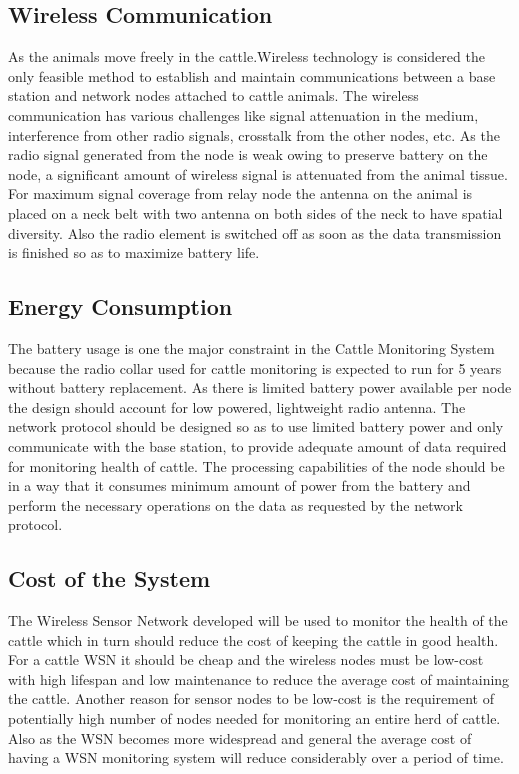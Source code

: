 \documentclass[conference]{IEEEtran}
\begin{document}
\subsection{Wireless Communication}

As the animals move freely in the cattle.Wireless technology is considered the
only feasible method to establish and maintain communications between a base
station and network nodes attached to cattle animals. The wireless
communication has various challenges like signal attenuation in the medium,
interference from other radio signals, crosstalk from the other nodes, etc. As
the radio signal generated from the node is weak owing to preserve battery on
the node, a significant amount of wireless signal is attenuated from the animal
tissue. For maximum signal coverage from relay node the antenna on the animal
is placed on a neck belt with two antenna on both sides of the neck to have
spatial diversity. Also the radio element is switched off as soon as the data
transmission is finished so as to maximize battery life.

\subsection{Energy Consumption}

The battery usage is one the major constraint in the Cattle Monitoring System
because the radio collar used for cattle monitoring is expected to run for
5 years without battery replacement. As there is limited battery power
available per node the design should account for low powered, lightweight radio
antenna. The network protocol should be designed so as to use limited battery
power and only communicate with the base station, to provide adequate amount of
data required for monitoring health of cattle. The processing capabilities of
the node should be in a way that it consumes minimum amount of power from the
battery and perform the necessary operations on the data as requested by the
network protocol.

\subsection{Cost of the System}

The Wireless Sensor Network developed will be used to monitor the health of the
cattle which in turn should reduce the cost of keeping the cattle in good
health. For a cattle WSN it should be cheap and the wireless nodes must be
low-cost with high lifespan and low maintenance to reduce the average cost of
maintaining the cattle. Another reason for sensor nodes to be low-cost is the
requirement of potentially high number of nodes needed for monitoring an entire
herd of cattle. Also as the WSN becomes more widespread and general the average
cost of having a WSN monitoring system will reduce considerably over a period
of time.  
\end{document}
